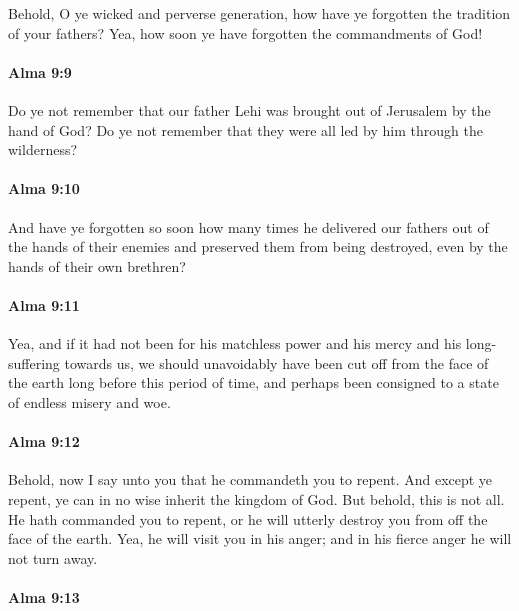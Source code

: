 			Behold, O ye wicked and perverse generation,
			how have ye forgotten the tradition of your fathers?
			Yea, how soon ye have forgotten the commandments of God!

		\paragraph{Alma 9:9} %
			\label{ALMA-9-9}

			Do ye not remember
			that our father Lehi was brought out of Jerusalem by the hand of God?
			Do ye not remember
			that they were all led by him through the wilderness?

		\paragraph{Alma 9:10} %
			\label{ALMA-9-10}

			And have ye forgotten so soon
			how many times he delivered our fathers out of the hands of their enemies
			and preserved them from being destroyed,
			even by the hands of their own brethren?

		\paragraph{Alma 9:11} %
			\label{ALMA-9-11}

			Yea, and if it had not been for his matchless power
			and his mercy and his long-suffering towards us,
			we should unavoidably have been cut off from the face of the earth
			long before this period of time,
			and perhaps been consigned to a state of endless misery and woe.

		\paragraph{Alma 9:12} %
			\label{ALMA-9-12}

			Behold, now I say unto you that he commandeth you to repent.
			And except ye repent, ye can in no wise inherit the kingdom of God.
			But behold, this is not all.
			He hath commanded you to repent,
			or he will utterly destroy you from off the face of the earth.
			Yea, he will visit you in his anger;
			and in his fierce anger he will not turn away.

		\paragraph{Alma 9:13} %
			\label{ALMA-9-13}

